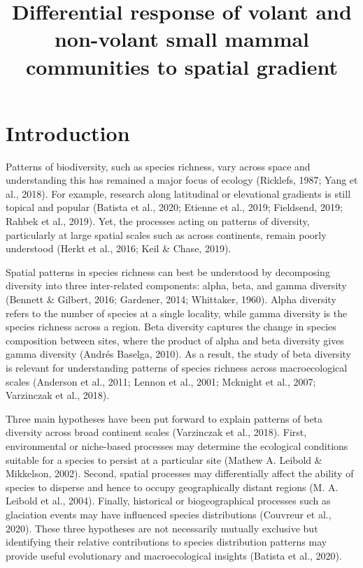 \documentclass{article}
\begin{document}
\title{Differential response of volant and non-volant small mammal communities to spatial gradient}
\begin{titlepage}
\maketitle
\end{titlepage}






\section{Introduction}
Patterns of biodiversity, such as species richness, vary across space and understanding this has remained a major focus of ecology (Ricklefs, 1987; Yang et al., 2018). For example, research along latitudinal or elevational gradients is still topical and popular (Batista et al., 2020; Etienne et al., 2019; Fieldsend, 2019; Rahbek et al., 2019). Yet, the processes acting on patterns of diversity, particularly at large spatial scales such as across continents, remain poorly understood (Herkt et al., 2016; Keil \& Chase, 2019). 

\vspace{5mm}


Spatial patterns in species richness can best be understood by decomposing diversity into three inter-related components: alpha, beta, and gamma diversity (Bennett \& Gilbert, 2016; Gardener, 2014; Whittaker, 1960). Alpha diversity refers to the number of species at a single locality, while gamma diversity is the species richness across a region. Beta diversity captures the change in species composition between sites, where the product of alpha and beta diversity gives gamma diversity (Andrés Baselga, 2010). As a result, the study of beta diversity is relevant for understanding patterns of species richness across macroecological scales (Anderson et al., 2011; Lennon et al., 2001; Mcknight et al., 2007; Varzinczak et al., 2018). 


\vspace{5mm}
Three main hypotheses have been put forward to explain patterns of beta diversity across broad continent scales (Varzinczak et al., 2018). First, environmental or niche-based processes may determine the ecological conditions suitable for a species to persist at a particular site (Mathew A. Leibold \& Mikkelson, 2002). Second, spatial processes may differentially affect the ability of species to disperse and hence to occupy geographically distant regions (M. A. Leibold et al., 2004). Finally, historical or biogeographical processes such as glaciation events may have influenced species distributions (Couvreur et al., 2020). These three hypotheses are not necessarily mutually exclusive but identifying their relative contributions to species distribution patterns may provide useful evolutionary and macroecological insights (Batista et al., 2020).
\end{document}

